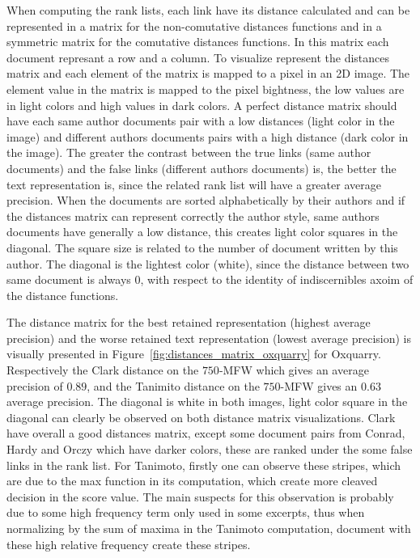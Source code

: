 When computing the rank lists, each link have its distance calculated and can be represented in a matrix for the non-comutative distances functions and in a symmetric matrix for the comutative distances functions.
In this matrix each document represant a row and a column.
To visualize represent the distances matrix and each element of the matrix is mapped to a pixel in an 2D image.
The element value in the matrix is mapped to the pixel bightness, the low values are in light colors and high values in dark colors.
A perfect distance matrix should have each same author documents pair with a low distances (light color in the image) and different authors documents pairs with a high distance (dark color in the image).
The greater the contrast between the true links (same author documents) and the false links (different authors documents) is, the better the text representation is, since the related rank list will have a greater average precision.
When the documents are sorted alphabetically by their authors and if the distances matrix can represent correctly the author style, same authors documents have generally a low distance, this creates light color squares in the diagonal.
The square size is related to the number of document written by this author.
The diagonal is the lightest color (white), since the distance between two same document is always 0, with respect to the identity of indiscernibles axoim of the distance functions.

The distance matrix for the best retained representation (highest average precision) and the worse retained text representation (lowest average precision) is visually presented in Figure~\ref{fig:distances_matrix_oxquarry} for Oxquarry.
Respectively the Clark distance on the $750$-MFW which gives an average precision of $0.89$, and the Tanimito distance on the $750$-MFW gives an $0.63$ average precision.
The diagonal is white in both images, light color square in the diagonal can clearly be observed on both distance matrix visualizations.
Clark have overall a good distances matrix, except some document pairs from Conrad, Hardy and Orczy which have darker colors, these are  ranked under the some false links in the rank list.
For Tanimoto, firstly one can observe these stripes, which are due to the max function in its computation, which create more cleaved decision in the score value.
The main suspects for this observation is probably due to some high frequency term only used in some excerpts, thus when normalizing by the sum of maxima in the Tanimoto computation, document with these high relative frequency create these stripes.

